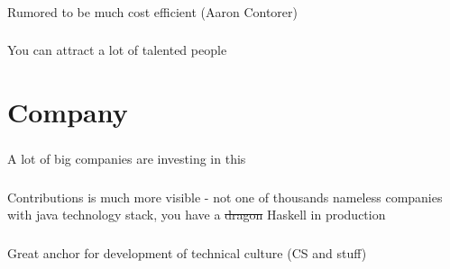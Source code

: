 \documentclass[usenames,dvipsnames, 18pt, compress, aspectratio=169]{beamer}
\begin{document}
\begin{frame}
    \frametitle{}
    \begin{center}
    Rumored to be much cost efficient (Aaron Contorer)
    \end{center}
\end{frame}

\begin{frame}
    \frametitle{}
    \begin{center}
    You can attract a lot of talented people
    \end{center}
\end{frame}

\fontsize{13pt}{14}\selectfont
\section{Company}
\fontsize{17pt}{18}\selectfont

\begin{frame}
    \frametitle{}
    \begin{center}
    A lot of big companies are investing in this
    \end{center}
\end{frame}

\begin{frame}
    \frametitle{}
    \begin{center}
    Contributions is much more visible - not one of thousands nameless
    companies with java technology stack, you have a \sout{dragon} Haskell in
    production
    \end{center}
\end{frame}

\begin{frame}
    \frametitle{}
    \begin{center}
    Great anchor for development of technical culture (CS and stuff)
    \end{center}
\end{frame}
\end{document}
